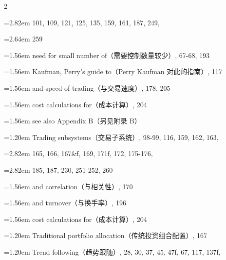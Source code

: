 {\begin{multicols}{2}
\par \noindent\hangindent=2.82em\hspace*{1.62em} 101, 109, 121, 125, 135, 159, 161, 187, 249,
\par \noindent\hangindent=2.64em\hspace*{1.44em} 259
\par \noindent\hangindent=1.56em\hspace*{0.36em} need for small number of（需要控制数量较少）, 67-68, 193
\par \noindent\hangindent=1.56em\hspace*{0.36em} Kaufman, Perry’s guide to（Perry Kaufman 对此的指南）, 117
\par \noindent\hangindent=1.56em\hspace*{0.36em} and speed of trading（与交易速度）, 178, 205
\par \noindent\hangindent=1.56em\hspace*{0.36em} cost calculations for（成本计算）, 204
\par \noindent\hangindent=1.56em\hspace*{0.36em} see also Appendix B（另见附录 B）
\par \noindent\hangindent=1.20em\hspace*{0.00em} Trading subsystems（交易子系统）, 98-99, 116, 159, 162, 163,
\par \noindent\hangindent=2.82em\hspace*{1.62em} 165, 166, 167\&f, 169, 171f, 172, 175-176,
\par \noindent\hangindent=2.82em\hspace*{1.62em} 185, 187, 230, 251-252, 260
\par \noindent\hangindent=1.56em\hspace*{0.36em} and correlation（与相关性）, 170
\par \noindent\hangindent=1.56em\hspace*{0.36em} and turnover（与换手率）, 196
\par \noindent\hangindent=1.56em\hspace*{0.36em} cost calculations for（成本计算）, 204
\par \noindent\hangindent=1.20em\hspace*{0.00em} Traditional portfolio allocation（传统投资组合配置）, 167
\par \noindent\hangindent=1.20em\hspace*{0.00em} Trend following（趋势跟随）, 28, 30, 37, 45, 47f, 67, 117, 137f,

\end{multicols}}
